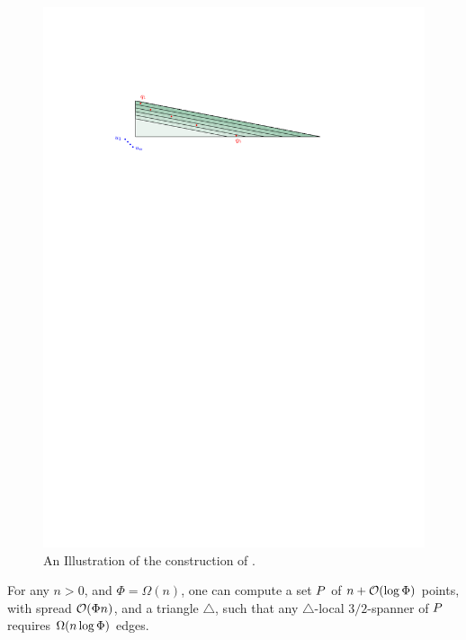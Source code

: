 \documentclass[12pt]{article}%
\begin{document}
\begin{figure}[h]
    \centering \includegraphics{figs/triangle_lower_bound}
    \caption{An Illustration of the construction of 
       .}
\end{figure}

\begin{lemma}
    For any $n > 0$, and $\Phi = \Omega(n)$, one can compute a set
    $P$ of $n+ \mathcal{O}(\log\Phi)$ points, with spread $\mathcal{O}(\Phi n)$, and
    a triangle $\triangle$, such that any $\triangle$-local
    $3/2$-spanner of $P$ requires $\Omega\pth{n\log\Phi }$ edges.
\end{lemma}
\end{document}
